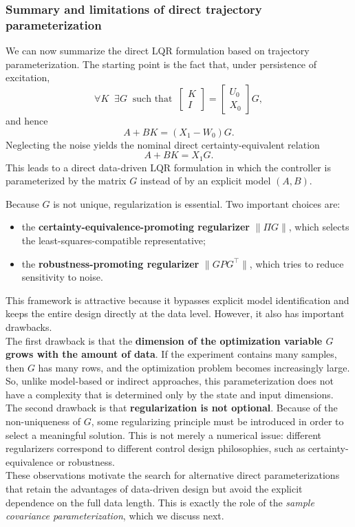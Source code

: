\subsubsection{Summary and limitations of direct trajectory parameterization}

We can now summarize the direct LQR formulation based on trajectory parameterization. The
starting point is the fact that, under persistence of excitation,
\[
\forall K\;\; \exists G \;\; \text{such that}\;\;
\begin{bmatrix}
K\\[0.3em]
I
\end{bmatrix}
=
\begin{bmatrix}
U_0\\[0.3em]
X_0
\end{bmatrix}G,
\]
and hence
\[
A+BK = (X_1-W_0)G.
\]
Neglecting the noise yields the nominal direct certainty-equivalent relation
\[
A+BK = X_1G.
\]
This leads to a direct data-driven LQR formulation in which the controller is parameterized by
the matrix $G$ instead of by an explicit model $(A,B)$.

Because $G$ is not unique, regularization is essential. Two important choices are:
\begin{itemize}
    \item the \textbf{certainty-equivalence-promoting regularizer} $\|\Pi G\|$, which selects the
    least-squares-compatible representative;
    \item the \textbf{robustness-promoting regularizer} $\|GPG^\top\|$, which tries to reduce sensitivity
    to noise.
\end{itemize}
This framework is attractive because it bypasses explicit model identification and keeps the
entire design directly at the data level. However, it also has important drawbacks.\\

The first drawback is that the \textbf{dimension of the optimization variable $G$ grows with the amount
of data}. If the experiment contains many samples, then $G$ has many rows, and the
optimization problem becomes increasingly large. So, unlike model-based or indirect approaches,
this parameterization does not have a complexity that is determined only by the state and input
dimensions.\\
The second drawback is that \textbf{regularization is not optional}. Because of the non-uniqueness
of $G$, some regularizing principle must be introduced in order to select a meaningful solution.
This is not merely a numerical issue: different regularizers correspond to different control
design philosophies, such as certainty-equivalence or robustness.\\
These observations motivate the search for alternative direct parameterizations that retain the
advantages of data-driven design but avoid the explicit dependence on the full data length. This
is exactly the role of the \emph{sample covariance parameterization}, which we discuss next.


